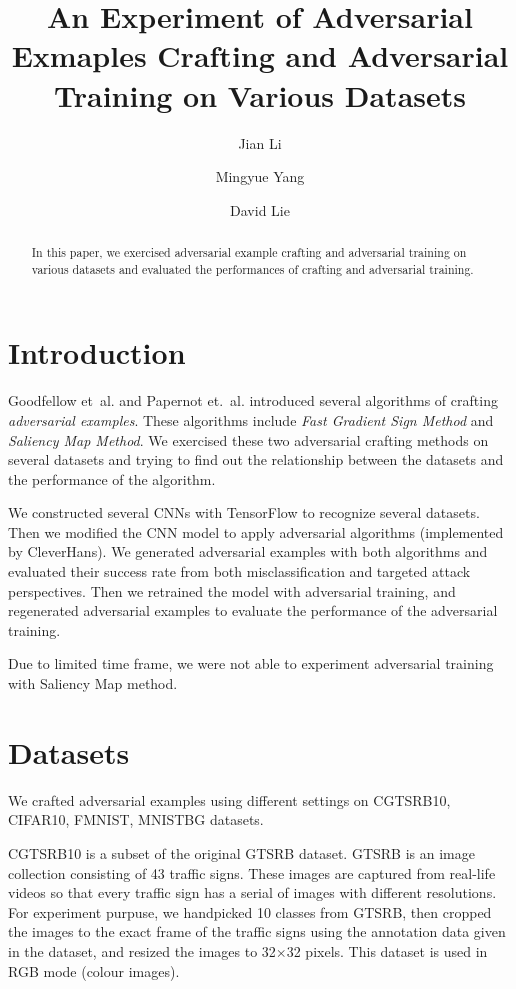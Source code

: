 \documentclass{article}
\begin{document}
\title{An Experiment of Adversarial Exmaples Crafting and Adversarial Training on Various Datasets}
\author{Jian Li \and Mingyue Yang \and David Lie}
\maketitle

\begin{abstract}
In this paper, we exercised adversarial example crafting and adversarial training on various datasets and evaluated the performances of crafting and adversarial training.
\end{abstract}

\section{Introduction}

Goodfellow et\ al. and Papernot et.\ al. introduced several algorithms of crafting \emph{adversarial examples}.
These algorithms include \emph{Fast Gradient Sign Method}\cite{goodfellow2015} and \emph{Saliency Map Method}\cite{papernot2015}.
We exercised these two adversarial crafting methods on several datasets and trying to find out the relationship between the datasets and the performance of the algorithm.

We constructed several CNNs with TensorFlow\cite{tensorflow} to recognize several datasets.
Then we modified the CNN model to apply adversarial algorithms (implemented by CleverHans\cite{cleverhans}).
We generated adversarial examples with both algorithms and evaluated their success rate from both misclassification and targeted attack perspectives.
Then we retrained the model with adversarial training, and regenerated adversarial examples to evaluate the performance of the adversarial training.

Due to limited time frame, we were not able to experiment adversarial training with Saliency Map method.

\section{Datasets}

We crafted adversarial examples using different settings on CGTSRB10, CIFAR10, FMNIST, MNISTBG datasets. 

CGTSRB10 is a subset of the original GTSRB\cite{gtsrb} dataset. GTSRB is an image collection consisting of 43 traffic signs. 
These images are captured from real-life videos so that every traffic sign has a serial of images with different resolutions.
For experiment purpuse, we handpicked 10 classes from GTSRB, then cropped the images to the exact frame of the traffic signs
using the annotation data given in the dataset, and resized the images to 32$\times$32 pixels. This dataset is used in RGB mode (colour images).
\end{document}
